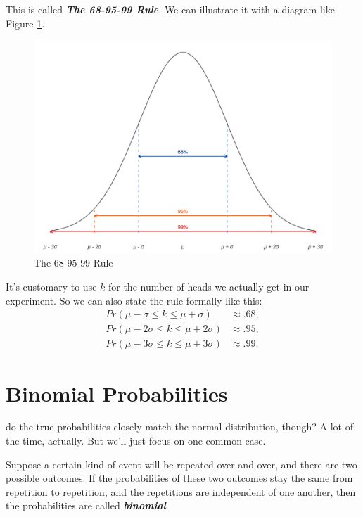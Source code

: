 \documentclass[justified]{tufte-book}
\newcommand{\p}{Pr}
\theoremstyle{definition}
\theoremstyle{definition}
\theoremstyle{definition}
\theoremstyle{remark}
\begin{document}
This is called \textbf{\emph{The 68-95-99 Rule}}. We can illustrate it with a diagram like Figure \ref{fig:snnrule}.

\begin{figure}
\includegraphics{_main_files/figure-latex/snnrule-1} \caption[The $68$-$95$-$99$ Rule]{The $68$-$95$-$99$ Rule}\label{fig:snnrule}
\end{figure}

It's customary to use \(k\) for the number of heads we actually get in our experiment. So we can also state the rule formally like this:
\[
  \begin{aligned}
    \p(\mu - \sigma \leq k \leq \mu + \sigma) &\approx .68,\\
    \p(\mu - 2\sigma \leq k \leq \mu + 2\sigma) &\approx .95,\\
    \p(\mu - 3\sigma \leq k \leq \mu + 3\sigma) &\approx .99.
  \end{aligned}
\]

\hypertarget{binomial-probabilities}{%
\section{Binomial Probabilities}\label{binomial-probabilities}}

 do the true probabilities closely match the normal distribution, though? A lot of the time, actually. But we'll just focus on one common case.

Suppose a certain kind of event will be repeated over and over, and there are two possible outcomes. If the probabilities of these two outcomes stay the same from repetition to repetition, and the repetitions are independent of one another, then the probabilities are called \textbf{\emph{binomial}}.
\end{document}
